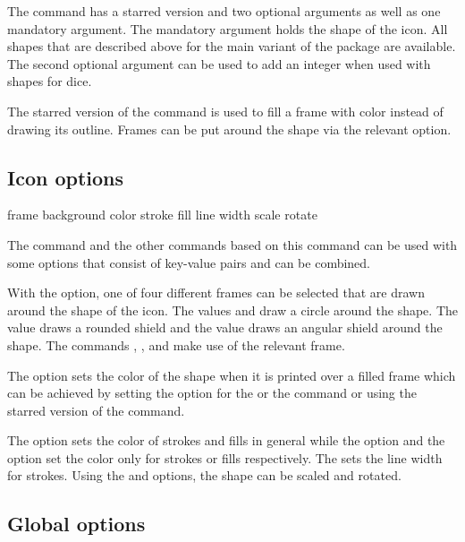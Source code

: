 \documentclass[a4paper]{article}
\let\ability\undefined
\begin{document}
The \macro{\DndIconsUseIcon} command has a starred version and two optional arguments as well as one mandatory argument. The mandatory argument holds the shape of the icon. All shapes that are described above for the main variant of the package are available. The second optional argument can be used to add an integer when used with shapes for dice.

The starred version of the command is used to fill a frame with color instead of drawing its outline. Frames can be put around the shape via the relevant  option. 

\subsection{Icon options}

\begin{macrodef}
frame
background
color
stroke
fill
line width
scale
rotate
\end{macrodef}
The \macro{\DndIconsUseIcon} command and the other commands based on this command can be used with some options that consist of key-value pairs and can be combined. 

With the  option, one of four different frames can be selected that are drawn around the shape of the icon. The values  and  draw a circle around the shape. The value  draws a rounded shield and the value  draws an angular shield around the shape. The commands \macro{\ability}, \macro{\saving}, \macro{\spellschool} and \macro{\damage} make use of the relevant frame.

The  option sets the color of the shape when it is printed over a filled frame which can be achieved by setting the  option for the \macro{\ability} or the \macro{\spellschool} command or using the starred version of the \macro{\DndIconsUseIcon} command.

The  option sets the color of strokes and fills in general while the  option and the  option set the color only for strokes or fills respectively. The  sets the line width for strokes. Using the  and  options, the shape can be scaled and rotated.

\subsection{Global options}
\end{document}
